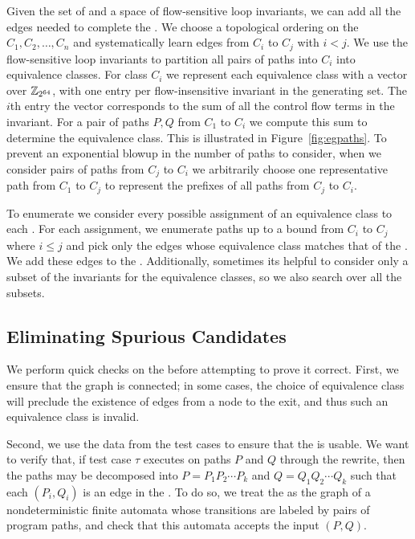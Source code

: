Given the set of \cutpoints and{} a space of flow-sensitive loop
invariants, we can add all the edges needed to complete the \bisimrep.
We choose a topological ordering on the \cutpoints{} $C_1, C_2,
\dotsc, C_n$ and systematically learn edges from $C_i$ to $C_j$ with
$i < j$. We use the flow-sensitive loop invariants to partition all
pairs of paths into $C_i$ into equivalence classes. For class $C_i$
we represent each equivalence class with a vector over $\mathbb{Z}_{2^{64}}$,
with one entry per flow-insensitive invariant in the generating set.
The $i$th entry the vector corresponds to the sum of all the control
flow terms in the invariant. For a pair of paths $P, Q$ from $C_1$ to
$C_i$ we compute this sum to determine the equivalence class. This is
illustrated in Figure~\ref{fig:egpaths}. To prevent an exponential
blowup in the number of paths to consider, when we consider pairs of
paths from $C_j$ to $C_i$ we arbitrarily choose one representative
path from $C_1$ to $C_j$ to represent the prefixes of all paths from
$C_j$ to $C_i$.

To enumerate \bisimreps{} we consider every possible assignment of an
equivalence class to each \cutpoint. For each assignment, we enumerate
paths up to a bound from $C_i$ to $C_j$ where $i \leq j$ and pick only
the edges whose equivalence class matches that of the \cutpoint. We
add these edges to the \bisimrep. Additionally, sometimes its helpful
to consider only a subset of the invariants for the equivalence
classes, so we also search over all the subsets.

\subsection{Eliminating Spurious Candidates} \label{algstep5}

We perform quick checks on the \bisimrep{} before attempting to prove
it correct. First, we ensure that the graph is connected; in some
cases, the choice of equivalence class will preclude the existence of
edges from a node to the exit, and thus such an equivalence class is
invalid.

Second, we use the data from the test cases to ensure that the
\bisimrep{} is usable. We want to verify that, if test case $\tau$
executes on paths $P$ and $Q$ through the rewrite, then the paths
may be decomposed into $P = P_1P_2\dotsm P_k$ and $Q = Q_1Q_2\dotsm
Q_k$ such that each $(P_i, Q_i)$ is an edge in the \bisimrep. To do
so, we treat the \bisimrep{} as the graph of a nondeterministic finite
automata whose transitions are labeled by pairs of program paths, and
check that this automata accepts the input $(P, Q)$. 

